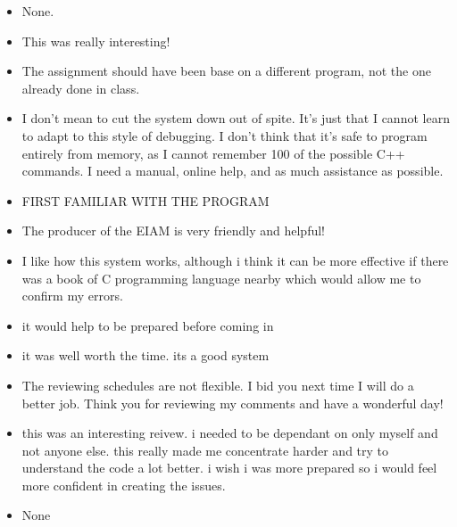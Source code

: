 \begin{enumerate}
\begin{itemize}
\item None.
\item This was really interesting!
\item The assignment should have been base on a different program, not the
one already done in class.
\item I don't mean to cut the system down out of spite.  It's just that I
cannot learn to adapt to this style of debugging.  I don't think that
it's safe to program entirely from memory, as I cannot remember 100%
of the possible C++ commands.  I need a manual, online help, and as
much assistance as possible.  
\item 
FIRST FAMILIAR WITH THE PROGRAM

\item The producer of the EIAM is very friendly and helpful!
\item I like how this system works, although i think it can be more
effective if there was a book of C programming language nearby
which would allow me to confirm my errors.
\item it would help to be prepared before coming in
\item it was well worth the time.  its a good system
\item The reviewing schedules are not flexible.  I bid you next time I will
do a better job.  Think you for reviewing my comments and have a
wonderful day!
\item this was an interesting reivew.  i needed to be dependant on only
myself and not anyone else.  this really made me concentrate harder and try
to understand the code a lot better.  i wish i was more prepared so i
would feel more confident in creating the issues.
\item None
\end{itemize}

\end{enumerate}

